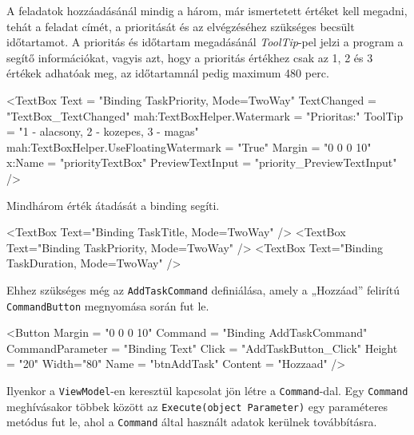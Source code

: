 

A feladatok hozzáadásánál mindig a három, már ismertetett értéket kell megadni, tehát a feladat címét, a prioritását és az elvégzéséhez szükséges becsült időtartamot. A prioritás és időtartam megadásánál \textit{ToolTip}-pel jelzi a program a segítő információkat, vagyis azt, hogy a prioritás értékhez csak az 1, 2 és 3 értékek adhatóak meg, az időtartamnál pedig maximum 480 perc.
\begin{java}
<TextBox
  Text = "{Binding TaskPriority, Mode=TwoWay}"
  TextChanged = "TextBox_TextChanged"
  mah:TextBoxHelper.Watermark = "Prioritas:"
  ToolTip = "1 - alacsony, 2 - kozepes, 3 - magas"
  mah:TextBoxHelper.UseFloatingWatermark = "True"
  Margin = "0 0 0 10"
  x:Name = "priorityTextBox"
  PreviewTextInput = "priority_PreviewTextInput"
/>
\end{java}
Mindhárom érték átadását a binding segíti.
\begin{java}
<TextBox Text="{Binding TaskTitle, Mode=TwoWay}" />
<TextBox Text="{Binding TaskPriority, Mode=TwoWay}" />
<TextBox Text="{Binding TaskDuration, Mode=TwoWay}" />
\end{java}
Ehhez szükséges még az \texttt{AddTaskCommand} definiálása, amely a „Hozzáad” felirítú \\ \texttt{CommandButton} megnyomása során fut le.
\begin{java}
<Button 
  Margin = "0 0 0 10"
  Command = "{Binding AddTaskCommand}"
  CommandParameter = "{Binding Text}"
  Click = "AddTaskButton_Click"
  Height = "20" Width="80"
  Name = "btnAddTask"
  Content = "Hozzaad"
/>	
\end{java}

Ilyenkor a \texttt{ViewModel}-en keresztül kapcsolat jön létre a \texttt{Command}-dal. Egy \texttt{Command} meghívásakor többek között az \texttt{Execute(object Parameter)} egy paraméteres metódus fut le, ahol a \texttt{Command} által használt adatok kerülnek továbbításra.

